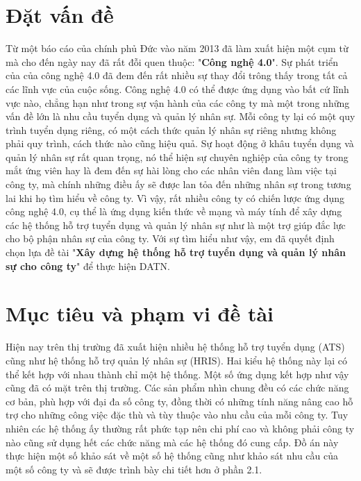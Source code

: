 \documentclass[../DoAn.tex]{subfiles}
\begin{document}
\section{Đặt vấn đề}
\label{section:1.1}
Từ một báo cáo của chính phủ Đức vào năm 2013 đã làm xuất hiện một cụm từ mà cho đến ngày nay đã rất đỗi quen thuộc: "\textbf{Công nghệ 4.0}". Sự phát triển của của công nghệ 4.0 đã đem đến rất nhiều sự thay đổi trông thấy trong tất cả các lĩnh vực của cuộc sống. Công nghệ 4.0 có thể được ứng dụng vào bất cứ lĩnh vực nào, chẳng hạn như trong sự vận hành của các công ty mà một trong những vấn đề lớn là nhu cầu tuyển dụng và quản lý nhân sự. Mỗi công ty lại có một quy trình tuyển dụng riêng, có một cách thức quản lý nhân sự riêng nhưng không phải quy trình, cách thức nào cũng hiệu quả. Sự hoạt động ở khâu tuyển dụng và quản lý nhân sự rất quan trọng, nó thể hiện sự chuyên nghiệp của công ty trong mắt ứng viên hay là đem đến sự hài lòng cho các nhân viên đang làm việc tại công ty, mà chính những điều ấy sẽ được lan tỏa đến những nhân sự trong tương lai khi họ tìm hiểu về công ty. Vì vậy, rất nhiều công ty có chiến lược ứng dụng công nghệ 4.0, cụ thể là ứng dụng kiến thức về mạng và máy tính để xây dựng các hệ thống hỗ trợ tuyển dụng và quản lý nhân sự như là một trợ giúp đắc lực cho bộ phận nhân sự của công ty. Với sự tìm hiểu như vậy, em đã quyết định chọn lựa đề tài "\textbf{Xây dựng hệ thống hỗ trợ tuyển dụng và quản lý nhân sự cho công ty}" để thực hiện DATN.

\section{Mục tiêu và phạm vi đề tài}
\label{section:1.2}
Hiện nay trên thị trường đã xuất hiện nhiều hệ thống hỗ trợ tuyển dụng (ATS) cũng như hệ thống hỗ trợ quản lý nhân sự (HRIS). Hai kiểu hệ thống này lại có thể kết hợp với nhau thành chỉ một hệ thống. Một số ứng dụng kết hợp như vậy cũng đã có mặt trên thị trường. Các sản phẩm nhìn chung đều có các chức năng cơ bản, phù hợp với đại đa số công ty, đồng thời có những tính năng nâng cao hỗ trợ cho những công việc đặc thù và tùy thuộc vào nhu cầu của mỗi công ty. Tuy nhiên các hệ thống ấy thường rất phức tạp nên chi phí cao và không phải công ty nào cũng sử dụng hết các chức năng mà các hệ thống đó cung cấp. Đồ án này thực hiện một số khảo sát về một số hệ thống cũng như khảo sát nhu cầu của một số công ty và sẽ được trình bày chi tiết hơn ở phần 2.1.
\end{document}

